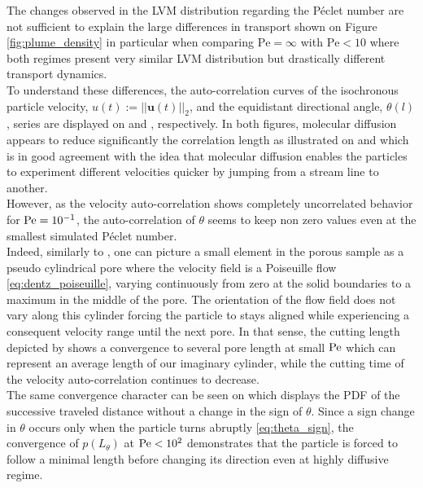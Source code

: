 The changes observed in the LVM distribution regarding the Péclet number are not sufficient to explain the large differences in transport shown on Figure \ref{fig:plume_density} in particular when comparing $\mathrm{Pe}=\infty$ with $\mathrm{Pe}<10$ where both regimes present very similar LVM distribution but drastically different transport dynamics.\\
To understand these differences, the auto-correlation curves of the isochronous particle velocity, $u(t):=||\textbf{u}(t)||_2$, and the equidistant directional angle, $\theta(l)$, series are displayed on  and , respectively.
In both figures, molecular diffusion appears to reduce significantly the correlation length as illustrated on  and  which is in good agreement with the idea that molecular diffusion enables the particles to experiment different velocities quicker by jumping from a stream line to another.\\
However, as the velocity auto-correlation shows completely uncorrelated behavior for $\mathrm{Pe}=10^{-1}$, the auto-correlation of $\theta$ seems to keep non zero values even at the smallest simulated Péclet number.\\
Indeed, similarly to \citet{Dentz2017}, one can picture a small element in the porous sample as a pseudo cylindrical pore where the velocity field is a Poiseuille flow \eqref{eq:dentz_poiseuille}, varying continuously from zero at the solid boundaries to a maximum in the middle of the pore.
The orientation of the flow field does not vary along this cylinder forcing the particle to stays aligned while experiencing a consequent velocity range until the next pore.
In that sense, the cutting length depicted by  shows a convergence to several pore length at small $\mathrm{Pe}$ which can represent an average length of our imaginary cylinder, while the cutting time of the velocity auto-correlation continues to decrease.\\
The same convergence character can be seen on  which displays the PDF of the successive traveled distance without a change in the sign of $\theta$.
Since a sign change in $\theta$ occurs only when the particle turns abruptly \eqref{eq:theta_sign}, the convergence of $p(L_\theta)$ at $\mathrm{Pe}<10^2$ demonstrates that the particle is forced to follow a minimal length before changing its direction even at highly diffusive regime.
